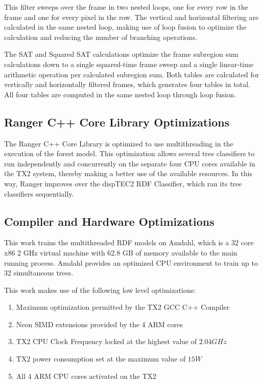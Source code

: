 This filter sweeps over the frame in two nested loops, one for every row in the frame and one for every pixel in the row. The vertical and horizontal filtering are calculated in the same nested loop, making use of loop fusion to optimize the calculation and reducing the number of branching operations.

The SAT and Squared SAT calculations optimize the frame subregion sum calculations down to a single squared-time frame sweep and a single linear-time arithmetic operation per calculated subregion sum. Both tables are calculated for vertically and horizontally filtered frames, which generates four tables in total. All four tables are computed in the same nested loop through loop fusion.

\subsection{Ranger C++ Core Library Optimizations}
\label{sec:sol_rdf}

The Ranger C++ Core Library is optimized to use multithreading in the execution of the forest model. This optimization allows several tree classifiers to run independently and concurrently on the separate four CPU cores available in the TX2 system, thereby making a better use of the available resources. In this way, Ranger improves over the dispTEC2 RDF Classifier, which ran its tree classifiers sequentially.

\subsection{Compiler and Hardware Optimizations}
\label{sec:sol_compiler}

This work trains the multithreaded RDF models on Amdahl, which is a 32 core x86 2 GHz virtual machine with 62.8 GB of memory available to the main running process. Amdahl provides an optimized CPU environment to train up to 32 simultaneous trees.

This work makes use of the following low level optimizations:
\begin{enumerate}
  \item Maximum optimization permitted by the TX2 GCC C++ Compiler
  \item Neon SIMD extensions provided by the 4 ARM cores
  \item TX2 CPU Clock Frequency locked at the highest value of $2.04\si{GHz}$
  \item TX2 power consumption set at the maximum value of $15 W$
  \item All 4 ARM CPU cores activated on the TX2
\end{enumerate}
